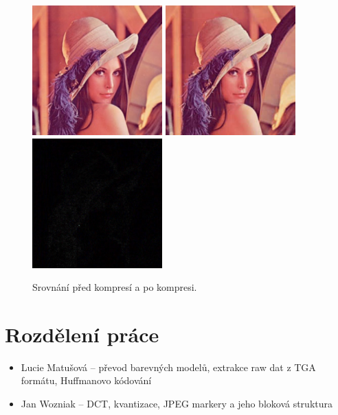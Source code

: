 \documentclass[11pt,a4paper]{article}
\begin{document}
\begin{figure}[H]
  \centering
  \includegraphics[width=5cm]{sample3.pdf}
  \includegraphics[width=5cm]{sample3_out.pdf}
  \includegraphics[width=5cm]{sample3_diff.pdf}
  \caption{Srovnání před kompresí a po kompresi.}
  \label{pipeline}
\end{figure}

\section{Rozdělení práce}
\begin{itemize}
\item Lucie Matušová -- převod barevných modelů, extrakce raw dat z TGA formátu, Huffmanovo kódování
\item Jan Wozniak -- DCT, kvantizace, JPEG markery a jeho bloková struktura
\end{itemize}

\end{document}

